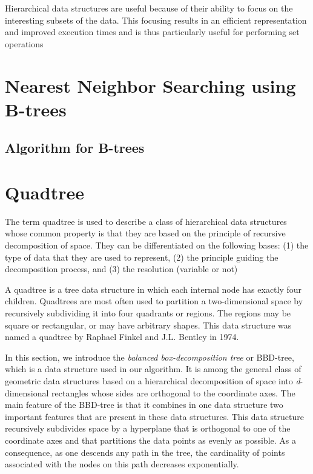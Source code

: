 \documentclass[ijoc,nonblindrev]{informs3} %
\begin{document}
Hierarchical data structures are useful because of their ability to focus on the
interesting subsets of the data. 
This focusing results in an efficient representation and improved execution times and is thus
particularly useful for performing set operations

\section{Nearest Neighbor Searching using B-trees}

\subsection{Algorithm for B-trees}

\section{Quadtree}
The term quadtree is used to describe a class of hierarchical data structures whose
common property is that they are based on the principle of recursive decomposition of space.
They can be differentiated on the following bases: 
(1) the type of data that they are used to represent, 
(2) the principle guiding the decomposition process, and 
(3) the resolution (variable or not)


A quadtree is a tree data structure in which each internal node has exactly four children. 
Quadtrees are most often used to partition a two-dimensional space by recursively 
subdividing it into four quadrants or regions. 
The regions may be square or rectangular, or may have arbitrary shapes. 
This data structure was named a quadtree by Raphael Finkel and J.L. Bentley in 1974. 

In this section, we introduce the \textit{balanced box-decomposition tree} or BBD-tree,
which is a data structure used in our algorithm. 
It is among the general class of geometric data structures based on a hierarchical decomposition of space
into \textit{d}-dimensional rectangles whose sides are orthogonal to the coordinate axes.
The main feature of the BBD-tree is that it combines in one data structure two
important features that are present in these data structures.
This data structure recursively subdivides space by a hyperplane that is orthogonal to one
of the coordinate axes and that partitions the data points as evenly as possible.
As a consequence, as one descends any path in the tree, the cardinality of points
associated with the nodes on this path decreases exponentially.
\end{document}

